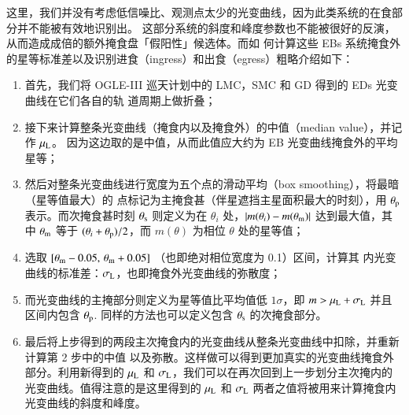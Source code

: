 这里，我们并没有考虑低信噪比、观测点太少的光变曲线，因为此类系统的在食部分并不能被有效地识别出。
这部分系统的斜度和峰度参数也不能被很好的反演，从而造成成倍的额外掩食盘「假阳性」候选体。而如
何计算这些 EBs 系统掩食外的星等标准差以及识别进食（ingress）和出食（egress）粗略介绍如下：


\begin{enumerate}
\item 首先，我们将 OGLE-III 巡天计划中的 LMC，SMC 和 GD 得到的 EDs 光变曲线在它们各自的轨
道周期\cite{Graczyk2011,Pawlak2013,Pietrukowicz2013}上做折叠；

\item 接下来计算整条光变曲线（掩食内以及掩食外）的中值（median value），并记作 $\mu_\mathrm{L}$。
因为这边取的是中值，从而此值应大约为 EB 光变曲线掩食外的平均星等；

\item 然后对整条光变曲线进行宽度为五个点的滑动平均（box smoothing），将最暗（星等值最大）的
点标记为主掩食甚（伴星遮挡主星面积最大的时刻），用 $\theta_\mathrm{p}$ 表示。而次掩食甚时刻 $
\theta_\mathrm{s}$ 则定义为在 $\theta_i$ 处，$|m(\theta_i) - m(\theta_\mathrm{m})|$ 达到最大值，其中 $
\theta_\mathrm{m}$ 等于 $(\theta_i+ \theta_\mathrm{p})/2$，而 $m(\theta)$ 为相位 $\theta$ 处的星等值；

\item 选取 $[\theta_\mathrm{m} - 0.05, \, \theta_\mathrm{m} + 0.05]$ （也即绝对相位宽度为 0.1）区间，计算其
内光变曲线的标准差：$\sigma_\mathrm{L}$，也即掩食外光变曲线的弥散度；

\item 而光变曲线的主掩部分则定义为星等值比平均值低 $1\sigma$，即 $m > \mu_\mathrm{L} + \sigma_\mathrm{L}
$ 并且区间内包含 $\theta_\mathrm{p}$. 同样的方法也可以定义包含 $\theta_\mathrm{s}$ 的次掩食部分。

\item 最后将上步得到的两段主次掩食内的光变曲线从整条光变曲线中扣除，并重新计算第 2 步中的中值
以及弥散。这样做可以得到更加真实的光变曲线掩食外部分。利用新得到的 $\mu_\mathrm{L}$ 和 $\sigma_
\mathrm{L}$，我们可以在再次回到上一步划分主次掩内的光变曲线。值得注意的是这里得到的 $\mu_\mathrm{L}$ 
和 $\sigma_\mathrm{L}$ 两者之值将被用来计算掩食内光变曲线的斜度和峰度。
\end{enumerate}

